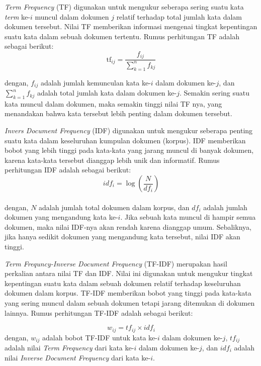 \documentclass[a4paper,12pt]{report}
\numberwithin{equation}{chapter}
\begin{document}
\textit{Term Frequency} (TF) digunakan untuk mengukur seberapa sering suatu kata \textit{term} ke-$i$ muncul dalam dokumen $j$ relatif terhadap total jumlah kata dalam dokumen tersebut. Nilai TF memberikan informasi mengenai tingkat kepentingan suatu kata dalam sebuah dokumen tertentu. Rumus perhitungan TF adalah sebagai berikut:
\begin{equation}
    \text{tf}_{ij} = \frac{f_{ij}}{\sum_{k=1}^{n} f_{kj}}
    \label{eq:TF}
\end{equation}

dengan, $f_{ij}$ adalah jumlah kemunculan kata ke-$i$ dalam dokumen ke-$j$, dan ${\sum_{k=1}^{n} f_{kj}}$ adalah total jumlah kata dalam dokumen ke-$j$. Semakin sering suatu kata muncul dalam dokumen, maka semakin tinggi nilai TF nya, yang menandakan bahwa kata tersebut lebih penting dalam dokumen tersebut.

\textit{Invers Document Frequency} (IDF) digunakan untuk mengukur seberapa penting suatu kata dalam keseluruhan kumpulan dokumen (korpus). IDF memberikan bobot yang lebih tinggi pada kata-kata yang jarang muncul di banyak dokumen, karena kata-kata tersebut dianggap lebih unik dan informatif. Rumus perhitungan IDF adalah sebagai berikut:
\begin{equation}
    idf_i = \log\left(\frac{N}{df_i}\right)
    \label{eq:IDF}
\end{equation}
\\
dengan, $N$ adalah jumlah total dokumen dalam korpus, dan $df_i$ adalah jumlah dokumen yang mengandung kata ke-$i$. Jika sebuah kata muncul di hampir semua dokumen, maka nilai IDF-nya akan rendah karena dianggap umum. Sebaliknya, jika hanya sedikit dokumen yang mengandung kata tersebut, nilai IDF akan tinggi.

\textit{Term Frequncy-Inverse Document Frequency} (TF-IDF) merupakan hasil perkalian antara nilai TF dan IDF. Nilai ini digunakan untuk mengukur tingkat kepentingan suatu kata dalam sebuah dokumen relatif terhadap keseluruhan dokumen dalam korpus. TF-IDF memberikan bobot yang tinggi pada kata-kata yang sering muncul dalam sebuah dokumen tetapi jarang ditemukan di dokumen lainnya. Rumus perhitungan TF-IDF adalah sebagai berikut:

\begin{equation}
    w_{ij} = tf_{ij} \times idf_i
    \label{eq:TFIDF}
\end{equation}
dengan, $w_{ij}$ adalah bobot TF-IDF untuk kata ke-$i$ dalam dokumen ke-$j$, $tf_{ij}$ adalah nilai \textit{Term Frequency} dari kata ke-$i$ dalam dokumen ke-$j$, dan $idf_i$ adalah nilai \textit{Inverse Document Frequency} dari kata ke-$i$. 
\end{document}
